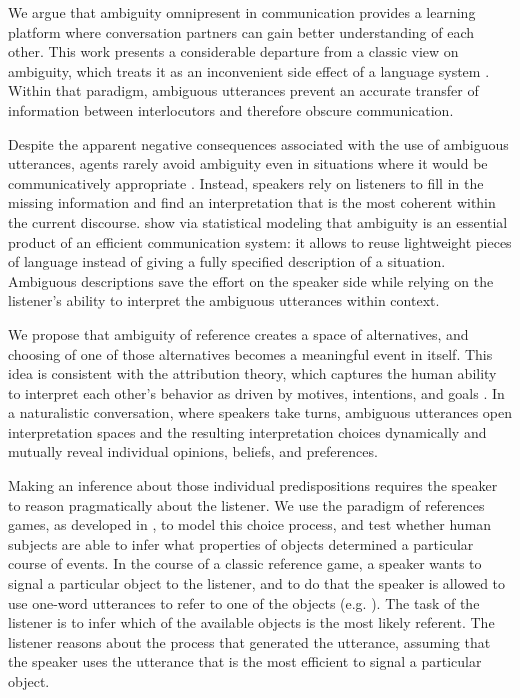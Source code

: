 \documentclass[10pt,a4paper]{article}
\begin{document}
We argue that ambiguity omnipresent in communication provides a learning platform where conversation partners can gain better understanding of each other.
This work presents a considerable departure from a classic view on ambiguity, which treats it as an inconvenient side effect of a language system \cite{grice1975,chomsky2002minimalism}.
Within that paradigm, ambiguous utterances prevent an accurate transfer of information between interlocutors and therefore obscure communication. 

Despite the apparent negative consequences associated with the use of ambiguous utterances, agents rarely avoid ambiguity even in situations where it would be communicatively appropriate \cite{wasow2015, ferreira2008}. Instead, speakers rely on listeners to fill in the missing information and find an interpretation that is the most coherent within the current discourse.   show via statistical modeling that ambiguity is an essential product of an efficient communication system: it allows to reuse lightweight pieces of language instead of giving a fully specified description of a situation. Ambiguous descriptions save the effort on the speaker side while relying on the listener's ability to interpret the ambiguous utterances within context.

We propose that ambiguity of reference creates a space of alternatives, and choosing of one of those alternatives becomes a meaningful event in itself. This idea is consistent with the attribution theory, which captures the human ability to interpret each other's behavior as driven by motives, intentions, and goals \cite{jones1965acts, kelley1967attribution, kelley1970social}.
In a naturalistic conversation, where speakers take turns, ambiguous utterances open interpretation spaces and the resulting interpretation choices dynamically and mutually reveal individual opinions, beliefs, and preferences. 
 
Making an inference about those individual predispositions requires the speaker to reason pragmatically about the listener.
We use the paradigm of references games, as developed in , to model this choice process, and test whether human subjects are able to infer what properties of objects determined a particular course of events. In the course of a classic reference game, a speaker wants to signal a particular object to the listener, and to do that the speaker is allowed to use one-word utterances to refer to one of the objects (e.g. ).
The task of the listener is to infer which of the available objects is the most likely referent.
The listener reasons about the process that generated the utterance, assuming that the speaker uses the utterance that is the most efficient to signal a particular object. 
\end{document}
